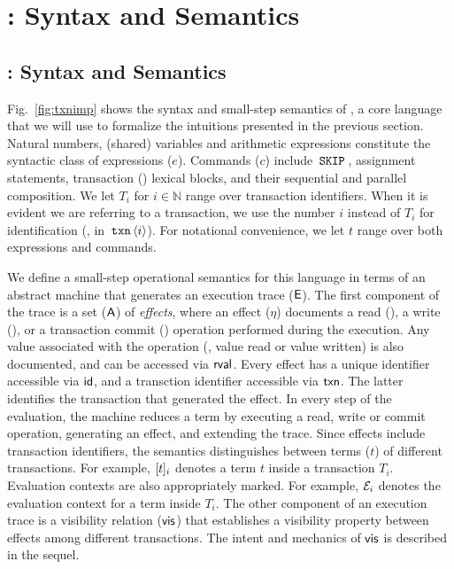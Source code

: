 \section{\txnimp: Syntax and Semantics}
\label{sec:opsem}

\label{sec:syntax}

\subsection{\txnimp: Syntax and Semantics}
\label{sec:opsem}



Fig.~\ref{fig:txnimp} shows the syntax and small-step semantics of
\txnimp, a core language that we will use to formalize the intuitions
presented in the previous section. Natural numbers, (shared) variables
and arithmetic expressions constitute the syntactic class of
expressions ($e$).  Commands ($c$) include $\,{\tt SKIP}\,$, assignment
statements, transaction () lexical blocks, and their sequential
and parallel composition. We let $T_i$ for $i \in \mathbb{N}$ range
over transaction identifiers. When it is evident we are referring to a
transaction, we use the number $i$ instead of $T_i$ for identification
(\eg, in $\,{\tt txn}\,\langle i \rangle$). For notational convenience, we
let $t$ range over both expressions and commands.

We define a small-step operational semantics for this language in
terms of an abstract machine that generates an execution trace
($\textsf{E}$). The first component of the trace is a set ($\textsf{A}$) of
\emph{effects}, where an effect ($\eta$) documents a read (),
a write (), or a transaction commit () operation
performed during the execution. Any value associated with the
operation (\eg, value read or value written) is also documented, and
can be accessed via $\textsf{rval}$. Every effect has a unique identifier
accessible via $\textsf{id}$, and a transction identifier accessible via
$\textsf{txn}$.  The latter identifies the transaction that generated the
effect. In every step of the evaluation, the machine reduces a \txnimp
term by executing a read, write or commit operation, generating an
effect, and extending the trace. Since effects include transaction
identifiers, the semantics distinguishes between terms ($t$) of
different transactions. For example, $\lbrack t \rbrack_i$ denotes a term $t$
inside a transaction $T_i$.  Evaluation contexts are also
appropriately marked. For example, $\mathcal{E}_i$ denotes the evaluation
context for a term inside $T_i$. The other component of an execution
trace is a visibility relation ($\textsf{vis}$) that establishes a visibility
property between effects among different transactions. The intent and
mechanics of $\textsf{vis}$ is described in the sequel.

